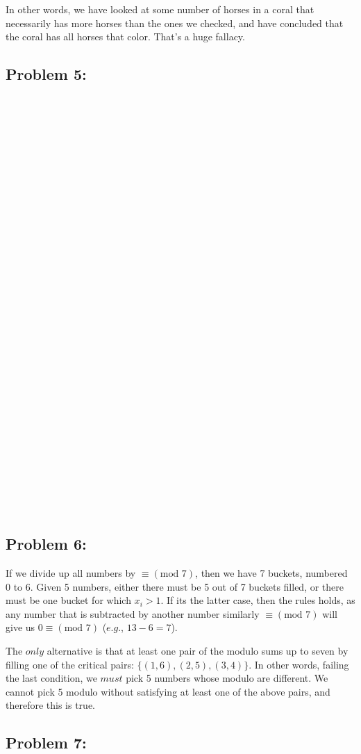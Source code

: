 \documentclass[a4paper]{article}
\begin{document}
In other words, we have looked at some number of horses in a coral that necessarily has more horses than the ones we checked, and have concluded that the coral has all horses that color. That's a huge fallacy.

\subsection*{Problem 5:  \\ \\ \\ \\ \\ \\ \\ \\ \\ \\ \\ \\ \\ \\ \\ \\ \\ \\ \\ \\ \\ \\}

\subsection*{Problem 6:}

If we divide up all numbers by $\equiv (\mbox{mod } 7)$, then we have 7 buckets, numbered 0 to 6. Given 5 numbers, either there must be 5 out of 7 buckets filled, or there must be one bucket for which $x_i > 1$. If its the latter case, then the rules holds, as any number that is subtracted by another number similarly $\equiv (\mbox{mod } 7)$ will give us $0 \equiv (\mbox{mod } 7)$ ($\textit{e.g.}$, $13-6 = 7$).

The $\textit{only}$ alternative is that at least one pair of the modulo sums up to seven by filling one of the critical pairs: $\{(1,6),(2,5),(3,4)\}$. In other words, failing the last condition, we $\textit{must}$ pick 5 numbers whose modulo are different. We cannot pick 5 modulo without satisfying at least one of the above pairs, and therefore this is true.

\subsection*{Problem 7:}
\end{document}
